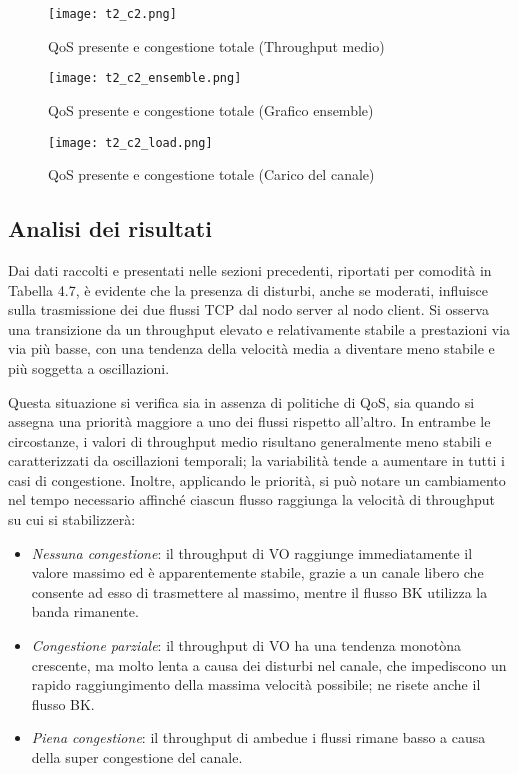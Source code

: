 \begin{figure}[h!]
    \centering
    \texttt{[image: t2\_c2.png]}
    \caption{QoS presente e congestione totale (Throughput medio)}
    \label{fig:t2_c2}
\end{figure}

\begin{figure}[h!]
    \centering
    \texttt{[image: t2\_c2\_ensemble.png]}
    \caption{QoS presente e congestione totale (Grafico ensemble)}
    \label{fig:t2_c2_ensemble}
\end{figure}
\clearpage
\begin{figure}[h!]
    \centering
    \texttt{[image: t2\_c2\_load.png]}
    \caption{QoS presente e congestione totale (Carico del canale)}
    \label{fig:t2_c2_load}
\end{figure}
\subsection[Analisi dei risultati]{Analisi dei risultati}
Dai dati raccolti e presentati nelle sezioni precedenti, riportati per comodità in Tabella 4.7, è evidente che la presenza di disturbi, anche se moderati, influisce sulla trasmissione dei due flussi TCP dal nodo server al nodo client. Si osserva una transizione da un throughput elevato e relativamente stabile a prestazioni via via più basse, con una tendenza della velocità media a diventare meno stabile e più soggetta a oscillazioni.

Questa situazione si verifica sia in assenza di politiche di QoS, sia quando si assegna una priorità maggiore a uno dei flussi rispetto all'altro. In entrambe le circostanze, i valori di throughput medio risultano generalmente meno stabili e caratterizzati da oscillazioni temporali; la variabilità tende a aumentare in tutti i casi di congestione. Inoltre, applicando le priorità, si può notare un cambiamento nel tempo necessario affinché ciascun flusso raggiunga la velocità di throughput su cui si stabilizzerà:
\begin{itemize}
    \item \textit{Nessuna congestione}: il throughput di VO raggiunge immediatamente il valore massimo ed è apparentemente stabile, grazie a un canale libero che consente ad esso di trasmettere al massimo, mentre il flusso BK utilizza la banda rimanente.
    \item \textit{Congestione parziale}: il throughput di VO ha una tendenza monotòna crescente, ma molto lenta a causa dei disturbi nel canale, che impediscono un rapido raggiungimento della massima velocità possibile; ne risete anche il flusso BK.
    \item \textit{Piena congestione}: il throughput di ambedue i flussi rimane basso a causa della super congestione del canale.
\end{itemize}

